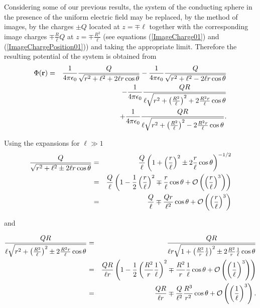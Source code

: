 Considering some of our previous results, the system of the conducting sphere in the presence of the uniform electric field may be replaced, by the method of images, by the charges $\pm Q$ located at $z= \mp \ell$ together with the corresponding image charges $\mp \frac{R}{\ell} Q$ at $z=\mp \frac{R^2}{\ell}$ (see equations (\ref{ImageCharge01}) and (\ref{ImageChargePosition01})) and taking the appropriate limit. Therefore the resulting potential of the system is obtained from
\begin{eqnarray}
\Phi (\textbf{r}) &=& \frac{1}{4\pi \epsilon_0} \frac{Q}{\sqrt{r^2 + \ell^2 +2\ell r \cos \theta}}  - \frac{1}{4\pi \epsilon_0} \frac{Q}{\sqrt{r^2 + \ell^2 -2\ell r \cos \theta}} \notag \\ 
& &- \frac{1}{4\pi \epsilon_0} \frac{Q R}{\ell \sqrt{r^2 + \left( \frac{R^2}{\ell} \right)^2 +2 \frac{R^2 r}{\ell} \cos \theta}} \notag \\
& & + \frac{1}{4\pi \epsilon_0} \frac{QR}{\ell \sqrt{r^2 + \left( \frac{R^2}{\ell} \right)^2 -2 \frac{R^2 r}{\ell} \cos \theta}} .
\end{eqnarray}

Using the expansions for $\ell \gg 1$
\begin{eqnarray}
\frac{Q}{\sqrt{r^2 + \ell^2 \pm 2\ell r \cos \theta}} &=& \frac{Q}{\ell} \left(  1 + \left(\frac{r}{\ell} \right) ^2 \pm 2\frac{r}{\ell} \cos \theta \right)^{-1/2} \notag \\
& = & \frac{Q}{\ell} \left(  1 -\frac{1}{2} \left(\frac{r}{\ell} \right) ^2 \mp \frac{r}{\ell} \cos \theta + \mathcal{O} \left( \left( \frac{r}{\ell} \right)^3 \right) \right)\notag \\
& = & \frac{Q}{\ell} \mp \frac{Qr}{\ell^2} \cos \theta + \mathcal{O} \left( \left( \frac{r}{\ell} \right)^3 \right)
\end{eqnarray}

and 

\begin{eqnarray}
\frac{Q R}{\ell \sqrt{r^2 + \left( \frac{R^2}{\ell} \right)^2 \pm 2 \frac{R^2 r}{\ell} \cos \theta}} 
&=& \frac{Q R}{\ell r \sqrt{1 + \left( \frac{R^2}{r} \frac{1}{\ell} \right)^2 \pm 2 \frac{R^2}{r} \frac{1}{\ell} \cos \theta}} \notag \\
& = & \frac{Q R}{\ell r} \left( 1 - \frac{1}{2} \left( \frac{R^2}{r} \frac{1}{\ell} \right)^2 \mp \frac{R^2}{r} \frac{1}{\ell} \cos \theta + \mathcal{O} \left( \left( \frac{1}{\ell} \right)^3  \right) \right) \notag  \\
& = & \frac{Q R}{\ell r}  \mp \frac{Q }{\ell ^2}  \frac{R^3}{r^2}  \cos \theta + \mathcal{O} \left( \left( \frac{1}{\ell} \right)^3  \right).
\end{eqnarray}

